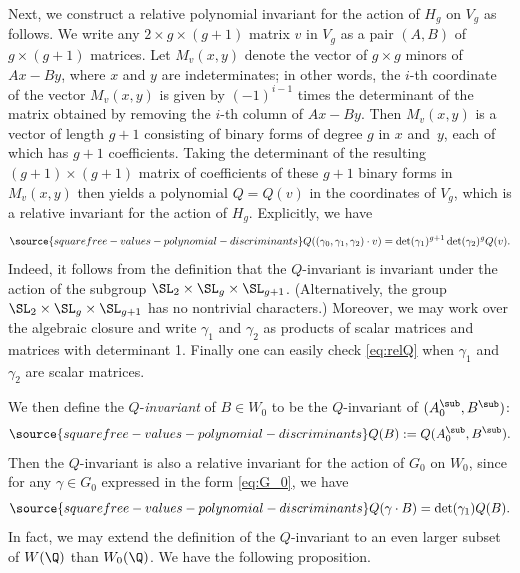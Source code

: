 
Next, we construct a relative polynomial invariant for the action of $H_g$ on
$V_g$ as follows.  We write any $2\times g\times (g+1)$ matrix $v$ in
$V_g$ as a pair $(A,B)$ of $g\times(g+1)$ matrices.  Let $M_v(x,y)$
denote the vector of $g\times g$ minors of $Ax-By$, where $x$ and $y$
are indeterminates; in other words, the $i$-th coordinate of the
vector $M_v(x,y)$ is given by $(-1)^{i-1}$ times the determinant of
the matrix obtained by removing the $i$-th column of $Ax-By$.  Then
$M_v(x,y)$ is a vector of length $g+1$ consisting of binary forms of
degree $g$ in $x$ and~$y$, each of which has $g+1$ coefficients.
Taking the determinant of the resulting $(g+1)\times(g+1)$ matrix of
coefficients of these $g+1$ binary forms in $M_v(x,y)$ then yields a
polynomial $Q=Q(v)$ in the coordinates of $V_g$, which is a relative
invariant for the action of $H_g$. Explicitly, we have
\begin{equation}\label{eq:relQ}
\source{squarefree-values-polynomial-discriminants}
Q((\gamma_0,\gamma_1,\gamma_2)\cdot v)=\det(\gamma_1)^{g+1}\det(\gamma_2)^g Q(v).
\end{equation}
Indeed, it follows from the definition that the $Q$-invariant is
invariant under the action of the subgroup
$\SL_2\times\SL_g\times\SL_{g+1}$. (Alternatively, the group
$\SL_2\times\SL_g\times\SL_{g+1}$ has no nontrivial characters.)
Moreover, we may work over the algebraic closure and write $\gamma_1$
and $\gamma_2$ as products of scalar matrices and matrices with
determinant 1.  Finally one can easily check \eqref{eq:relQ} when
$\gamma_1$ and $\gamma_2$ are scalar matrices.

We then define the $Q$-{\it invariant} of $B\in W_0$ to be the
$Q$-invariant of $(A_0^\sub,B^\sub)$:
\begin{equation}\label{eqQB}
\source{squarefree-values-polynomial-discriminants}
Q(B):=Q(A_0^\sub,B^\sub).
\end{equation}
Then the $Q$-invariant is also a relative invariant for the action of $G_0$ on $W_0$, since for any
$\gamma\in G_0$ expressed in the form \eqref{eq:G_0}, we have
\begin{equation}\label{eq:weightG_0}
\source{squarefree-values-polynomial-discriminants}
Q(\gamma\cdot B) = \det(\gamma_1)Q(B).
\end{equation}
In fact, we may extend the definition of the $Q$-invariant to an even
larger subset of $W(\Q)$ than $W_0(\Q)$. We have the following
proposition.

